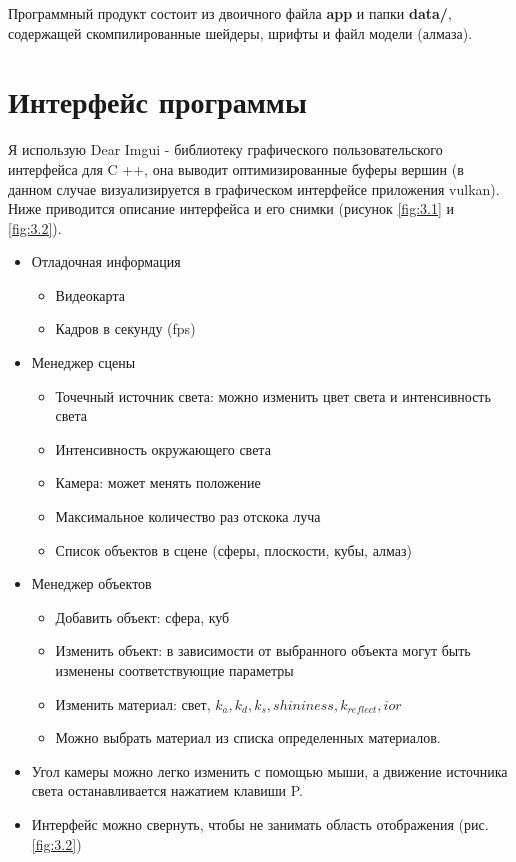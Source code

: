 Программный продукт состоит из двоичного файла \textbf{app} и папки \textbf{data/}, содержащей скомпилированные шейдеры, шрифты и файл модели (алмаза).


\section{Интерфейс программы}

Я использую Dear Imgui - библиотеку графического пользовательского интерфейса для C ++,
она выводит оптимизированные буферы вершин (в данном случае визуализируется в графическом интерфейсе приложения vulkan).
Ниже приводится описание интерфейса и его снимки (рисунок \ref{fig:3.1} и \ref{fig:3.2}).

\begin{itemize}
    \item Отладочная информация
    \begin{itemize}
        \item Видеокарта
        \item Кадров в секунду (fps)
    \end{itemize}
    \item Менеджер сцены
    \begin{itemize}
        \item Точечный источник света: можно изменить цвет света и интенсивность света
        \item Интенсивность окружающего света
        \item Камера: может менять положение
        \item Максимальное количество раз отскока луча
        \item Список объектов в сцене (сферы, плоскости, кубы, алмаз)
    \end{itemize}
    \item Менеджер объектов
    \begin{itemize}
        \item Добавить объект: сфера, куб
        \item Изменить объект: в зависимости от выбранного объекта могут быть
    изменены соответствующие параметры
        \item Изменить материал: свет, $k_a, k_d, k_s, shininess, k_{reflect}, ior$
        \item Можно выбрать материал из списка определенных материалов.
    \end{itemize}
    \item Угол камеры можно легко изменить с помощью мыши, а движение источника света останавливается нажатием клавиши P.
    \item Интерфейс можно свернуть, чтобы не занимать область отображения (рис. \ref{fig:3.2})
\end{itemize}


